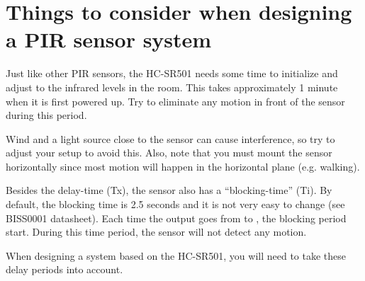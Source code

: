 \section{Things to consider when designing a PIR sensor system}

Just like other PIR sensors, the HC-SR501 needs some time to initialize and adjust to the infrared levels in the room. This takes approximately 1 minute when it is first powered up. Try to eliminate any motion in front of the sensor during this period.

Wind and a light source close to the sensor can cause interference, so try to adjust your setup to avoid this. Also, note that you must mount the sensor horizontally since most motion will happen in the horizontal plane (e.g. walking).

Besides the delay-time (Tx), the sensor also has a ``blocking-time'' (Ti). By default, the blocking time is 2.5 seconds and it is not very easy to change (see BISS0001 datasheet). Each time the output goes from  to , the blocking period start. During this time period, the sensor will not detect any motion.

When designing a system based on the HC-SR501, you will need to take these delay periods into account.